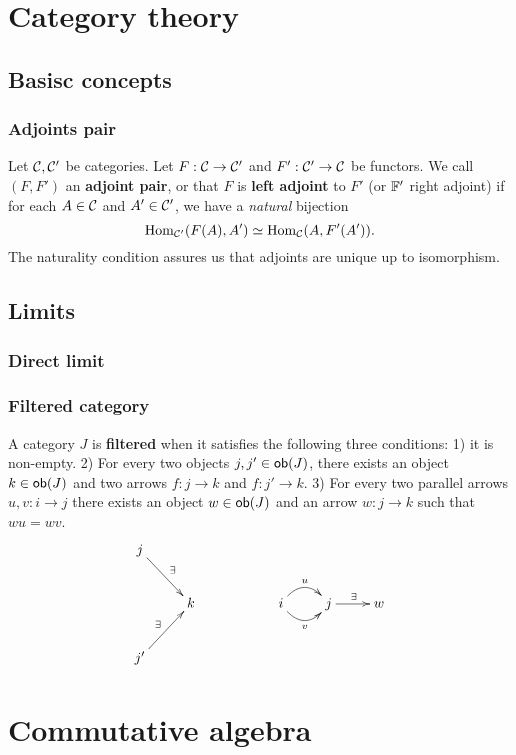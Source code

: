 \documentclass[11pt, english]{article}
\begin{document}

\section{Category theory}
\subsection{Basisc concepts}

\subsubsection{Adjoints pair}
\label{adjoint}

Let $\mathcal{C},\mathcal{C}'$ be categories. Let $F:\mathcal{C} \to \mathcal{C}'$ and $F':\mathcal{C}' \to \mathcal{C}$ be functors. We call $(F,F')$ an \textbf{adjoint pair}, or that $F$ is \textbf{left adjoint} to $F'$ (or $\mathbb{F}'$ right adjoint) if for each $A \in \mathcal{C}$ and $A' \in \mathcal{C}'$, we have a \emph{natural} bijection
\[
\operatorname{Hom}_{\mathcal{C}'}(F(A),A') \simeq \operatorname{Hom}_{\mathcal{C}}(A,F'(A')).
\]
The naturality condition assures us that adjoints are unique up to isomorphism. 

\subsection{Limits}

\subsubsection{Direct limit}
\label{directlimit}



\subsubsection{Filtered category}
\label{filteredcategory}
A category $J$ is \textbf{filtered} when it satisfies the following three conditions: 1) it is non-empty. 2) For every two objects $j,j' \in \mathsf{ob}(J)$, there exists an object $k \in \mathsf{ob}(J)$ and two arrows $f:j \to k$ and $f:j' \to k$. 3) For every two parallel arrows $u,v:i \to j$ there exists an object $w \in \mathsf{ob}(J)$ and an arrow $w:j \to k$ such that $wu=wv$.
\[
\xymatrix{
j \ar[dr]^\exists  &  & \\
  &  k &  & i \ar@/^{1pc}/[r]^u \ar@/_{1pc}/[r]_v  & j \ar[r]^\exists &  w \\ 
j' \ar[ur]^\exists  &
}
\]


\section{Commutative algebra}
\end{document}
